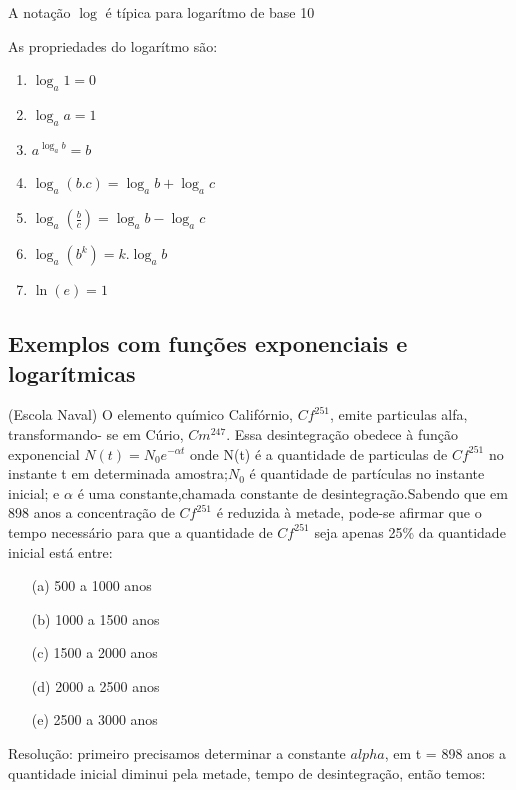\begin{multicols*}{2}
    A notação $\log$ é típica para logarítmo de base 10

    As propriedades do logarítmo são:

    \begin{enumerate}
        \item $\log_a 1 = 0$
        \item $\log_a a = 1$
        \item $a^{\log_a b} = b$
        \item $\log_a (b.c) = \log_a b + \log_a c$
        \item $\log_a \left( \frac{b}{c} \right) = \log_a b - \log_a c$
        \item $\log_a (b^k) = k.\log_a b$
        \item $\ln(e) = 1$

    \end{enumerate}


    \subsection{Exemplos com funções exponenciais e logarítmicas}

    (Escola Naval) O elemento químico Califórnio, $Cf^{251}$, emite particulas alfa, transformando-			se em Cúrio, $Cm^{247}$. Essa desintegração obedece à função exponencial $N(t) = N_0 e^{ - 				\alpha t}$ onde N(t) é a quantidade de particulas de $Cf^{251}$ no instante t em determinada 			amostra;$N_0$ é quantidade de partículas no instante inicial; e $\alpha$ é uma 							constante,chamada constante  de desintegração.Sabendo que em 898 anos a concentração de 				$Cf^{251}$ é reduzida à metade, pode-se afirmar que o tempo necessário para que a
    quantidade de $Cf^{251}$ seja apenas 25\% da quantidade inicial está entre:

    \begin{itemize}
        \item[(a)] 500 a 1000 anos
        \item[(b)] 1000 a 1500 anos
        \item[(c)] 1500 a 2000 anos
        \item[(d)] 2000 a 2500 anos
        \item[(e)] 2500 a 3000 anos
    \end{itemize}

    Resolução: primeiro precisamos determinar a constante $alpha$, em t = 898 anos a quantidade 			inicial diminui pela metade, tempo de desintegração, então temos:


\end{multicols*}
